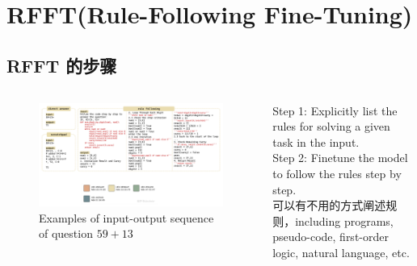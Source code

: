 \section{RFFT(Rule-Following Fine-Tuning)}

\subsection{RFFT 的步骤}


\begin{frame}
	\begin{columns}
		\begin{column}{.7\textwidth}
			\begin{figure}[t]
				\centering
				\includegraphics[width=\textwidth]{pic/prompt_new.pdf}
				\vspace{-5pt}
				\caption{Examples of input-output sequence of question $59+13$}
				\label{prompt}
			\end{figure}
		\end{column}
		\begin{column}{.3\textwidth}
			Step 1: Explicitly list the rules for solving a given task in the input.\\[0.2cm]

			Step 2: Finetune the model to follow the rules step by step.\\[0.2cm]

			可以有不用的方式阐述规则，including programs, pseudo-code, first-order logic, natural language, etc.
		\end{column}
	\end{columns}
\end{frame}

